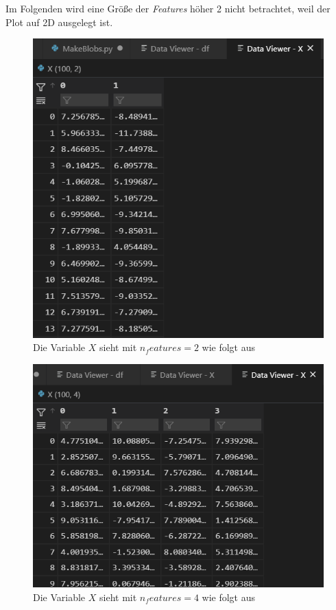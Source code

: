 Im Folgenden wird eine Größe der \textit{Features} höher 2 nicht betrachtet, weil der Plot auf 2D ausgelegt ist.
\begin{figure}[H]
	\centering
	\includegraphics[scale = 0.8]{attachment/chapter_1/Scc161}
	\caption{Die Variable $X$ sieht mit $n_features = 2$ wie folgt aus}
\end{figure}

\begin{figure}[H]
	\centering
	\includegraphics[scale = 0.8]{attachment/chapter_1/Scc162}
	\caption{Die Variable $X$ sieht mit $n_features = 4$ wie folgt aus}
\end{figure}

